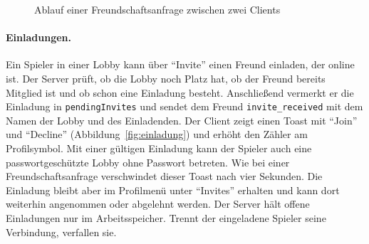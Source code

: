 \begin{figure}[ht]
\centering
{}
\caption{Ablauf einer Freundschaftsanfrage zwischen zwei Clients}
\label{fig:seq-freund}
\end{figure}

\paragraph{Einladungen.} Ein Spieler in einer Lobby kann über \enquote{Invite} einen Freund einladen, der online ist. Der Server prüft, ob die Lobby noch Platz hat, ob der Freund bereits Mitglied ist und ob schon eine Einladung besteht. Anschließend vermerkt er die Einladung in \texttt{pendingInvites} und sendet dem Freund \texttt{invite\_received} mit dem Namen der Lobby und des Einladenden. Der Client zeigt einen Toast mit \enquote{Join} und \enquote{Decline} (Abbildung~\ref{fig:einladung}) und erhöht den Zähler am Profilsymbol. Mit einer gültigen Einladung kann der Spieler auch eine passwortgeschützte Lobby ohne Passwort betreten.
Wie bei einer Freundschaftsanfrage verschwindet dieser Toast nach vier Sekunden. Die Einladung bleibt aber im Profilmenü unter \enquote{Invites} erhalten und kann dort weiterhin angenommen oder abgelehnt werden. Der Server hält offene Einladungen nur im Arbeitsspeicher. Trennt der eingeladene Spieler seine Verbindung, verfallen sie.

